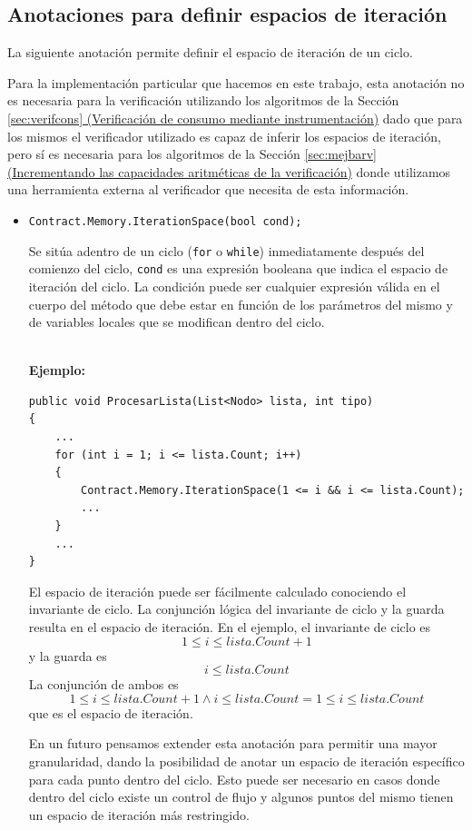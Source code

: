 \documentclass[12pt,a4paper]{article}
\newcommand\mono[1]{\texttt{#1}}
\begin{document}
		\subsection{Anotaciones para definir espacios de iteración}
			La siguiente anotación permite definir el espacio de iteración de un ciclo.

			Para la implementación particular que hacemos en este trabajo, esta anotación no es necesaria para la verificación utilizando los algoritmos de la Sección \hyperref[sec:verifcons]{\ref*{sec:verifcons} (Verificación de consumo mediante instrumentación)} dado que para los mismos el verificador utilizado es capaz de inferir los espacios de iteración, pero sí es necesaria para los algoritmos de la Sección \hyperref[sec:mejbarv]{\ref*{sec:mejbarv} (Incrementando las capacidades aritméticas de la verificación)} donde utilizamos una herramienta externa al verificador que necesita de esta información.

			\begin{itemize}
				\item
					\mono{Contract.Memory.IterationSpace(bool cond);}

					Se sitúa adentro de un ciclo (\mono{for} o \mono{while}) inmediatamente después del comienzo del ciclo, \mono{cond} es una expresión booleana que indica el espacio de iteración del ciclo. La condición puede ser cualquier expresión válida en el cuerpo del método que debe estar en función de los parámetros del mismo y de variables locales que se modifican dentro del ciclo.

					\noindent\\
					\textbf{Ejemplo:}
					\begin{footnotesize}
					\begin{lstlisting}[caption=Ejemplo de \mono{Contract.Memory.IterationSpace},numbers=none]
public void ProcesarLista(List<Nodo> lista, int tipo)
{
	...
	for (int i = 1; i <= lista.Count; i++)
	{
		Contract.Memory.IterationSpace(1 <= i && i <= lista.Count);
		...
	}
	...
}
					\end{lstlisting}
					\end{footnotesize}

					El espacio de iteración puede ser fácilmente calculado conociendo el invariante de ciclo. La conjunción lógica del invariante de ciclo y la guarda resulta en el espacio de iteración. En el ejemplo, el invariante de ciclo es $$1 \leq i \leq lista.Count + 1$$ y la guarda es $$i \leq lista.Count$$La conjunción de ambos es $$1 \leq i \leq lista.Count + 1 \wedge i \leq lista.Count = 1 \leq i \leq lista.Count$$ que es el espacio de iteración.

					En un futuro pensamos extender esta anotación para permitir una mayor granularidad, dando la posibilidad de anotar un espacio de iteración específico para cada punto dentro del ciclo. Esto puede ser necesario en casos donde dentro del ciclo existe un control de flujo y algunos puntos del mismo tienen un espacio de iteración más restringido.
			\end{itemize}
\end{document}
